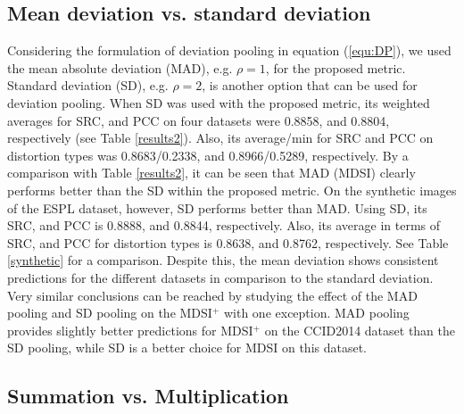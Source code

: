 \subsection{Mean deviation vs. standard deviation}
\label{vs1}

Considering the formulation of deviation pooling in equation (\ref{equ:DP}), we used the mean absolute deviation (MAD), e.g. $\rho=1$, for the proposed metric. Standard deviation (SD), e.g. $\rho=2$, is another option that can be used for deviation pooling. When SD was used with the proposed metric, its weighted averages for SRC, and PCC on four datasets were 0.8858, and 0.8804, respectively (see Table \ref{results2}). Also, its average/min for SRC and PCC on distortion types was 0.8683/0.2338, and 0.8966/0.5289, respectively. By a comparison with Table \ref{results2}, it can be seen that MAD (MDSI) clearly performs better than the SD within the proposed metric. On the synthetic images of the ESPL dataset, however, SD performs better than MAD. Using SD, its SRC, and PCC is 0.8888, and 0.8844, respectively. Also, its average in terms of SRC, and PCC for distortion types is 0.8638, and 0.8762, respectively. See Table \ref{synthetic} for a comparison. Despite this, the mean deviation shows consistent predictions for the different datasets in comparison to the standard deviation. Very similar conclusions can be reached by studying the effect of the MAD pooling and SD pooling on the MDSI$^+$ with one exception. MAD pooling provides slightly better predictions for MDSI$^+$ on the CCID2014 dataset than the SD pooling, while SD is a better choice for MDSI on this dataset.        


\subsection{Summation vs. Multiplication}
\label{vs2}
    
